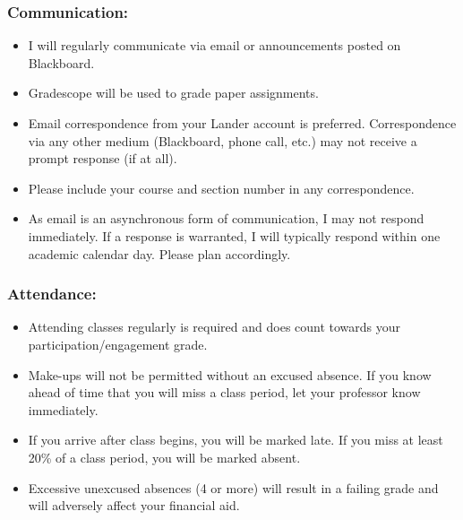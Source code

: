 \documentclass{article}
\begin{document}
      \subsubsection*{Communication:}
        \begin{itemize}
          \item I will regularly communicate via email or announcements posted on Blackboard.
          \item Gradescope will be used to grade paper assignments.
          \item Email correspondence from your Lander account is preferred.
            Correspondence via any other medium (Blackboard, phone call, etc.) may not receive a prompt response (if at all).
          \item Please include your course and section number in any correspondence.
          \item As email is an asynchronous form of communication, I may not respond immediately.
            If a response is warranted, I will typically respond within one academic calendar day. Please plan accordingly.
        \end{itemize}%


      \subsubsection*{Attendance:}
        \begin{itemize}
          \item Attending classes regularly is required and does count towards your participation/engagement grade.
          \item Make-ups will not be permitted without an excused absence. If you know ahead of time that you will miss a class period, let your professor know immediately.
          \item If you arrive after class begins, you will be marked late. If you miss at least 20\% of a class period, you will be marked absent.
          \item Excessive unexcused absences (4 or more) will result in a failing grade and will adversely affect your financial aid.
        \end{itemize}
\end{document}
